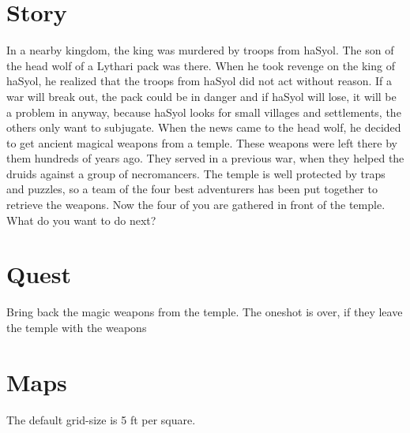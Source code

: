 \documentclass[a4paper,10pt,twoside,twocolumn,bg=print]{dndbook} %
\begin{document}
	\section{Story}
		In a nearby kingdom, the king was murdered by troops from haSyol. The son of the head wolf of a Lythari pack was there. When he took revenge on the king of haSyol, he realized that the troops from haSyol did not act without reason. If a war will break out, the pack could be in danger and if haSyol will lose, it will be a problem in anyway, because haSyol looks for small villages and settlements, the others only want to subjugate.\linebreak
		When the news came to the head wolf, he decided to get ancient magical weapons from a temple. These weapons were left there by them hundreds of years ago. They served in a previous war, when they helped the druids against a group of necromancers. The temple is well protected by traps and puzzles, so a team of the four best adventurers has been put together to retrieve the weapons. Now the four of you are gathered in front of the temple.\linebreak
		What do you want to do next?
	\section{Quest}
		Bring back the magic weapons from the temple.\linebreak
		The oneshot is over, if they leave the temple with the weapons
	\vfill
	\pagebreak
	\section{Maps}
		The default grid-size is 5 ft per square.
\end{document}

